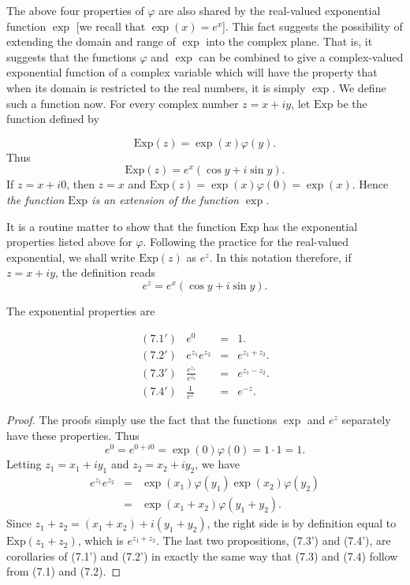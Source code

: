 The above four properties of $\varphi$ are also shared by the real-valued exponential function $\exp$ [we recall that $\exp(x) = e^{x}$]. This fact suggests the possibility of extending the domain and range of $\exp$ into the complex plane. That is, it suggests that the functions $\varphi$ and $\exp$ can be combined to
give a complex-valued exponential function of a complex variable which will have the property
that when its domain is restricted to the real numbers, it is simply $\exp$. We define such a
function now. For every complex number $z = x + iy$, let  $\mbox{Exp}$ be the function defined by

$$
\mbox{Exp}(z) = \exp(x) \varphi(y).
$$
\noindent Thus
$$
\mbox{Exp}(z) = e^{x}(\cos y + i \sin y).
$$
If $z = x + i0$, then $z = x$ and $\mbox{Exp}(z) = \exp(x) \varphi (0) = \exp(x)$. Hence \textit{the function $\mbox{Exp}$ is an extension of the function $\exp$.}

It is a routine matter to show that the function  $\mbox{Exp}$ has the exponential properties listed above for $\varphi$. Following the practice for the real-valued exponential, we shall write $\mbox{Exp}(z)$ as $e^z$. In this notation therefore, if $z = x + iy$, the definition reads
$$
 e^z = e^{x}(\cos y + i \sin y). 
$$

The exponential properties are
\begin{theorem}
$$
\begin{array}{lrcl}
\mathrm{( 7.1')}&                               e^0 &=& 1. \\
\mathrm{( 7.2')}&        e^{z_{1}}e^{z_{2}} &=& e^{z_{1} + z_{2}}.\\
\mathrm{( 7.3')}& \frac{e^{z_1}}{e^{z_2}} &=& e^{z_{1} - z_{2}}.\\
\mathrm{( 7.4')}&                \frac{1}{e^z}  &=& e^{-z}.
\end{array}
$$
\end{theorem}

\begin{proof}
The proofs simply use the fact that the functions $\exp$ and $e^z$
separately have 
these properties. Thus
$$
e^0 = e^{0+i0} = \exp(0) \varphi(0) = 1 \cdot 1 = 1. 
$$
Letting $z_{1} = x_{1} + iy_{1}$ and $z_{2} = x_{2} + iy_{2}$, we have 
\begin{eqnarray*}
e^{z_{1}}e^{z_{2}} &=& \exp(x_{1}) \varphi (y_{1}) \exp(x_{2})\varphi(y_{2})\\
                              &=& \exp(x_{1} + x_{2}) \varphi (y_{1} + y_{2}). 
\end{eqnarray*}
\noindent Since $z_{1} + z_{2} = (x_{1} + x_{2}) + i(y_{1} + y_{2})$, the right side is by
definition equal to $\mbox{Exp}(z_{1} + z_{2})$, which is $e^{z_{1}+z_2}$. The last two propositions, 
(7.3') and (7.4'), are corollaries of (7.1') and (7.2') in exactly the same way that (7.3) 
and (7.4) follow from (7.1) and (7.2).
\end{proof}

